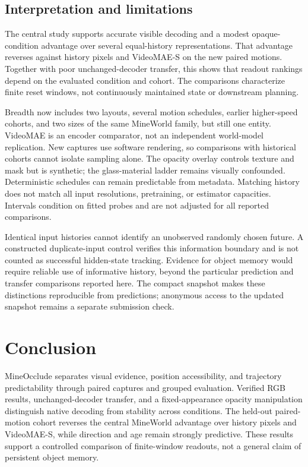 \documentclass{article}
\begin{document}
\subsection{Interpretation and limitations}
\label{sec:limitations}
The central study supports accurate visible decoding and a modest opaque-condition advantage over several equal-history representations. That advantage reverses against history pixels and VideoMAE-S on the new paired motions. Together with poor unchanged-decoder transfer, this shows that readout rankings depend on the evaluated condition and cohort. The comparisons characterize finite reset windows, not continuously maintained state or downstream planning.

Breadth now includes two layouts, several motion schedules, earlier higher-speed cohorts, and two sizes of the same MineWorld family, but still one entity. VideoMAE is an encoder comparator, not an independent world-model replication. New captures use software rendering, so comparisons with historical cohorts cannot isolate sampling alone. The opacity overlay controls texture and mask but is synthetic; the glass-material ladder remains visually confounded. Deterministic schedules can remain predictable from metadata. Matching history does not match all input resolutions, pretraining, or estimator capacities. Intervals condition on fitted probes and are not adjusted for all reported comparisons.

Identical input histories cannot identify an unobserved randomly chosen future. A constructed duplicate-input control verifies this information boundary and is not counted as successful hidden-state tracking. Evidence for object memory would require reliable use of informative history, beyond the particular prediction and transfer comparisons reported here. The compact snapshot makes these distinctions reproducible from predictions; anonymous access to the updated snapshot remains a separate submission check.

\section{Conclusion}
MineOcclude separates visual evidence, position accessibility, and trajectory predictability through paired captures and grouped evaluation. Verified RGB results, unchanged-decoder transfer, and a fixed-appearance opacity manipulation distinguish native decoding from stability across conditions. The held-out paired-motion cohort reverses the central MineWorld advantage over history pixels and VideoMAE-S, while direction and age remain strongly predictive. These results support a controlled comparison of finite-window readouts, not a general claim of persistent object memory.
\end{document}
